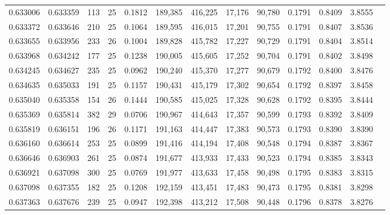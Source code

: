 \begin{tabular}{rrrrrrrrrrrrr}
0.633006 & 0.633359 &   113 &  25 &                                     0.1812 & 189,385 & 416,225 &  17,176 &  90,780 & 0.1791 & 0.8409 & 3.8555 \\
0.633372 & 0.633646 &   210 &  25 &                                     0.1064 & 189,595 & 416,015 &  17,201 &  90,755 & 0.1791 & 0.8407 & 3.8536 \\
0.633655 & 0.633956 &   233 &  26 &                                     0.1004 & 189,828 & 415,782 &  17,227 &  90,729 & 0.1791 & 0.8404 & 3.8514 \\
0.633968 & 0.634242 &   177 &  25 &                                     0.1238 & 190,005 & 415,605 &  17,252 &  90,704 & 0.1791 & 0.8402 & 3.8498 \\
0.634245 & 0.634627 &   235 &  25 &                                     0.0962 & 190,240 & 415,370 &  17,277 &  90,679 & 0.1792 & 0.8400 & 3.8476 \\
0.634635 & 0.635033 &   191 &  25 &                                     0.1157 & 190,431 & 415,179 &  17,302 &  90,654 & 0.1792 & 0.8397 & 3.8458 \\
0.635040 & 0.635358 &   154 &  26 &                                     0.1444 & 190,585 & 415,025 &  17,328 &  90,628 & 0.1792 & 0.8395 & 3.8444 \\
0.635369 & 0.635814 &   382 &  29 &                                     0.0706 & 190,967 & 414,643 &  17,357 &  90,599 & 0.1793 & 0.8392 & 3.8409 \\
0.635819 & 0.636151 &   196 &  26 &                                     0.1171 & 191,163 & 414,447 &  17,383 &  90,573 & 0.1793 & 0.8390 & 3.8390 \\
0.636160 & 0.636614 &   253 &  25 &                                     0.0899 & 191,416 & 414,194 &  17,408 &  90,548 & 0.1794 & 0.8387 & 3.8367 \\
0.636646 & 0.636903 &   261 &  25 &                                     0.0874 & 191,677 & 413,933 &  17,433 &  90,523 & 0.1794 & 0.8385 & 3.8343 \\
0.636921 & 0.637098 &   300 &  25 &                                     0.0769 & 191,977 & 413,633 &  17,458 &  90,498 & 0.1795 & 0.8383 & 3.8315 \\
0.637098 & 0.637355 &   182 &  25 &                                     0.1208 & 192,159 & 413,451 &  17,483 &  90,473 & 0.1795 & 0.8381 & 3.8298 \\
0.637363 & 0.637676 &   239 &  25 &                                     0.0947 & 192,398 & 413,212 &  17,508 &  90,448 & 0.1796 & 0.8378 & 3.8276 \\

\end{tabular}
